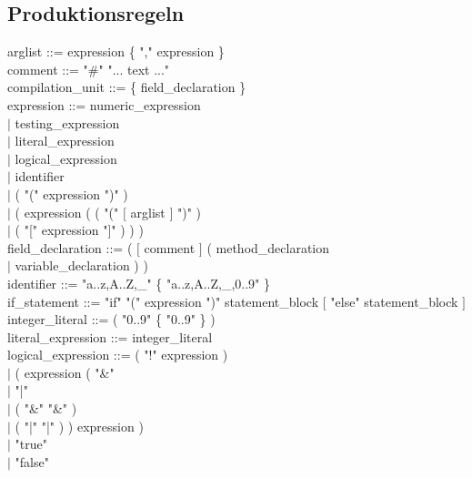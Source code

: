 \documentclass[10pt,a4paper,titlepage]{article}
\begin{document}
\subsection{Produktionsregeln}
\begin{ttfamily}
arglist ::=  expression \{ "," expression \}\\

comment ::= "\#" "... text ..."\\

compilation\_unit ::= \{ field\_declaration \}\\

expression ::= numeric\_expression \\
		\hspace*{3cm}$\mid$ testing\_expression\\
		\hspace*{3cm}$\mid$ literal\_expression\\
		\hspace*{3cm}$\mid$ logical\_expression\\
		\hspace*{3cm}$\mid$ identifier\\
		\hspace*{3cm}$\mid$ ( "(" expression ")" )\\
		\hspace*{3cm}$\mid$ ( expression ( ( "(" $[$ arglist $]$ ")" )\\
					\hspace*{6.3cm}$\mid$ ( "[" expression "]" ) ) )\\
					
field\_declaration ::= ( $[$ comment $]$ ( method\_declaration \\
					\hspace*{7cm}$\mid$ variable\_declaration ) )\\

identifier ::= "a..z,A..Z,\_" \{ "a..z,A..Z,\_,0..9" \}\\

if\_statement ::= "if" "(" expression ")" statement\_block $[$ "else" statement\_block $]$\\

integer\_literal ::= ( "0..9" \{ "0..9" \} )\\

literal\_expression ::= integer\_literal\\

logical\_expression ::= ( "!" expression )\\
		\hspace*{4.5cm}$\mid$ ( expression ( "\&" \\
				\hspace*{7.5cm}$\mid$ "|" \\
				\hspace*{7.5cm}$\mid$ ( "\&" "\&" )\\ 
				\hspace*{7.5cm}$\mid$ ( "|" "|" ) ) expression )\\
		\hspace*{4.5cm}$\mid$ "true" \\
		\hspace*{4.5cm}$\mid$ "false" \\
		

\end{ttfamily}
\end{document}
